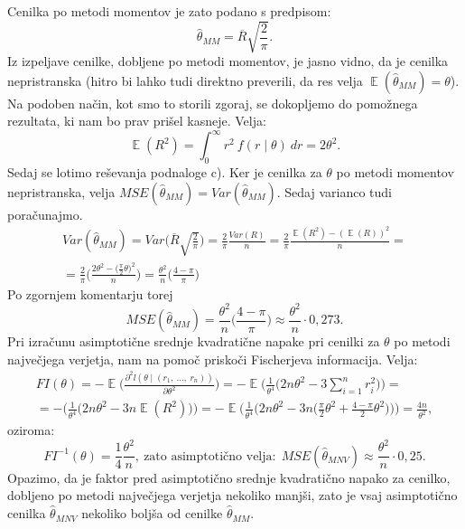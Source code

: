 \documentclass{article}
\DeclareMathOperator{\EX}{\mathbb{E}}
\begin{document}
Cenilka po metodi momentov je zato podano s predpisom:
$$
\hat{\theta}_{MM} = \overline{R} \sqrt{\frac{2}{\pi}}.
$$
Iz izpeljave cenilke, dobljene po metodi momentov, je jasno vidno, da je cenilka nepristranska (hitro bi lahko tudi direktno preverili, da res velja $\EX(\hat{\theta}_{MM}) = \theta$).
\newline
Na podoben način, kot smo to storili zgoraj, se dokopljemo do pomožnega rezultata, ki nam bo prav prišel kasneje. Velja:
$$
\EX(R^2) = \int_{0}^{\infty}{r^2~f(r \mid \theta)~dr}= 2 \theta^2.
$$
\newline
\newline
Sedaj se lotimo reševanja podnaloge c). Ker je cenilka za $\theta$ po metodi momentov nepristranska, velja $MSE(\hat{\theta}_{MM}) = Var(\hat{\theta}_{MM})$. Sedaj varianco tudi poračunajmo.
\begin{equation*}
    \begin{split}
    Var(\hat{\theta}_{MM}) = Var\bigg(\overline{R} \sqrt{\frac{2}{\pi}}\bigg) = \frac{2}{\pi} \frac{Var(R)}{n} = \frac{2}{\pi}\frac{\EX(R^2) - (\EX(R))^2}{n} = \\
    = \frac{2}{\pi}\bigg(\frac{2 \theta^2 - \big(\frac{\pi}{2} \theta\big)^2}{n}\bigg) = \frac{\theta^2}{n} \bigg(\frac{4 - \pi}{\pi}\bigg)
    \end{split}
\end{equation*}
Po zgornjem komentarju torej
$$
MSE(\hat{\theta}_{MM}) = \frac{\theta^2}{n} \bigg(\frac{4 - \pi}{\pi}\bigg)\approx \frac{\theta^2}{n} \cdot 0{,}273.
$$
Pri izračunu asimptotične srednje kvadratične napake pri cenilki za $\theta$ po metodi največjega verjetja, nam na pomoč priskoči Fischerjeva informacija. 
Velja:
\begin{equation*}
    \begin{split}
    FI(\theta) = - \EX\bigg(\frac{\partial^2 l(\theta \mid (r_1,~\dots,~r_n))}{\partial \theta^2}\bigg) = -\EX\bigg(\frac{1}{\theta^4}\bigg(2n\theta^2 - 3 \sum_{i=1}^{n}{r_i^2}\bigg)\bigg) = \\
    = -\bigg(\frac{1}{\theta^4}\bigg(2n \theta^2 - 3n \EX(R^2)\bigg)\bigg) = -\EX\bigg(\frac{1}{\theta^4}\bigg(2n \theta^2 - 3n \Big(\frac{\pi}{2} \theta^2 + \frac{4- \pi}{2}\theta^2\Big)\bigg)\bigg) = \frac{4n}{\theta^2}, 
    \end{split}
\end{equation*}
oziroma: 
$$ 
    FI^{-1}(\theta) = \frac{1}{4}\frac{\theta^2}{n},~\text{zato asimptotično velja:}~~MSE(\hat{\theta}_{MNV}) \approx \frac{\theta^2}{n} \cdot 0{,}25. 
$$
Opazimo, da je faktor pred asimptotično srednje kvadratično napako za cenilko, dobljeno po metodi največjega verjetja nekoliko manjši, zato je vsaj asimptotično cenilka $\hat{\theta}_{MNV}$ nekoliko boljša od cenilke $\hat{\theta}_{MM}$.
\end{document}
